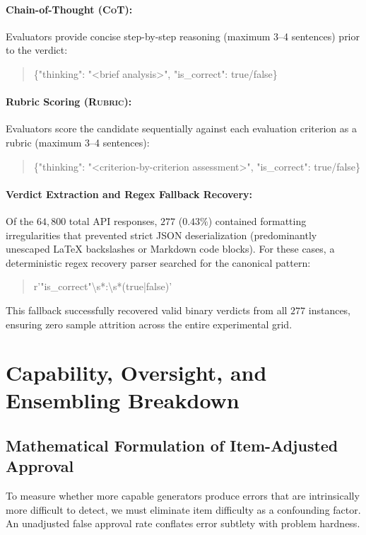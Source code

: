 \paragraph{Chain-of-Thought (\textsc{CoT}):}
Evaluators provide concise step-by-step reasoning (maximum 3--4 sentences) prior to the verdict:
\begin{quote}
\ttfamily \{"thinking": "<brief analysis>", "is\_correct": true/false\}
\end{quote}

\paragraph{Rubric Scoring (\textsc{Rubric}):}
Evaluators score the candidate sequentially against each evaluation criterion as a rubric (maximum 3--4 sentences):
\begin{quote}
\ttfamily \{"thinking": "<criterion-by-criterion assessment>", "is\_correct": true/false\}
\end{quote}

\paragraph{Verdict Extraction and Regex Fallback Recovery:}
Of the $64{,}800$ total API responses, $277$ ($0.43\%$) contained formatting irregularities that prevented strict JSON deserialization (predominantly unescaped LaTeX backslashes or Markdown code blocks). For these cases, a deterministic regex recovery parser searched for the canonical pattern:
\begin{quote}
\ttfamily r'"is\_correct"\textbackslash{}s*:\textbackslash{}s*(true|false)'
\end{quote}
This fallback successfully recovered valid binary verdicts from all $277$ instances, ensuring zero sample attrition across the entire experimental grid.

\section{Capability, Oversight, and Ensembling Breakdown}
\label{app:capability}

\subsection{Mathematical Formulation of Item-Adjusted Approval}
To measure whether more capable generators produce errors that are intrinsically more difficult to detect, we must eliminate item difficulty as a confounding factor. An unadjusted false approval rate conflates error subtlety with problem hardness. 

